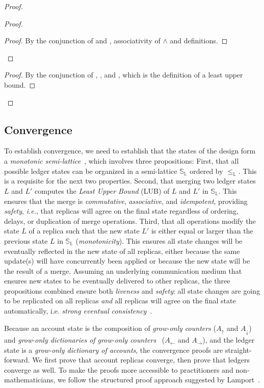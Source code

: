 \documentclass[9pt, oneside]{article}   	%
\begin{document}
\begin{proof}
\begin{proof}
		\qedstep
		\begin{proof}
			By the conjunction of  and , associativity of $\wedge$ and definitions.
		\end{proof}
	\end{proof}
		
	\qedstep
	\begin{proof}
		By the conjunction of , , and , which is the definition of a least upper bound.
	\end{proof}
\end{proof}

\subsection{Convergence}

To establish convergence, we need to establish that the states of the design form a \textit{monotonic semi-lattice}~\cite{shapiro:hal-00932836}, which involves three propositions: First, that all possible ledger states can be organized in a semi-lattice $\mathds{S}_\mathds{L}$ ordered by $\leq_\mathds{L}$. This is a requisite for the next two properties. Second, that merging two ledger states $L$ and $L'$ computes the \textit{Least Upper Bound} (LUB) of $L$ and $L'$ in $\mathds{S}_\mathds{L}$. This ensures that the merge is \textit{commutative}, \textit{associative}, and \textit{idempotent}, providing \textit{safety}, \textit{i.e.}, that replicas will agree on the final state regardless of ordering, delays, or duplication of merge operations. Third, that all operations modify the state $L$ of a replica such that the new state $L'$ is either equal or larger than the previous state $L$ in $\mathds{S}_\mathds{L}$ (\textit{monotonicity}). This ensures all state changes will be eventually reflected in the new state of all replicas, either because the same update(s) will have concurrently been applied or because the new state will be the result of a merge. Assuming an underlying communication medium that ensures new states to be eventually delivered to other replicas, the three propositions combined ensure both \textit{liveness} and \textit{safety}: all state changes are going to be replicated on all replicas \textit{and} all replicas will agree on the final state automatically, i.e. \textit{strong eventual consistency}~\cite{shapiro:hal-00932836}.

Because an account state is the composition of \textit{grow-only counters} ($A_\uparrow$ and $A_\downarrow$) and \textit{grow-only dictionaries of grow-only counters}~\cite{lavoie2023statebased} ($A_\leftarrow$ and $A_\rightarrow$), and the ledger state is a \textit{grow-only dictionary of accounts}, the convergence proofs are straight-forward. We first prove that account replicas converge, then prove that ledgers converge as well. To make the proofs more accessible to practitioners and non-mathematicians, we follow the structured proof approach suggested by Lamport~\cite{lamport2012write}.
\end{document}
